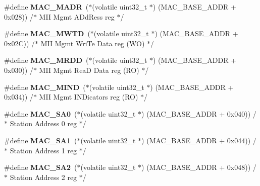 \begin{DoxyCompactItemize}
\item 
\mbox{\label{group__lpc24xx__regs_gace13d839acb863126a084b80082e0f72}} 
\#define {\bfseries M\+A\+C\+\_\+\+M\+A\+DR}~($\ast$(volatile uint32\+\_\+t $\ast$) (M\+A\+C\+\_\+\+B\+A\+S\+E\+\_\+\+A\+D\+DR + 0x028)) /$\ast$ M\+I\+I Mgmt A\+Dd\+Ress reg $\ast$/
\item 
\mbox{\label{group__lpc24xx__regs_ga9a456119d71c75f1ef7803b25b9d0a3c}} 
\#define {\bfseries M\+A\+C\+\_\+\+M\+W\+TD}~($\ast$(volatile uint32\+\_\+t $\ast$) (M\+A\+C\+\_\+\+B\+A\+S\+E\+\_\+\+A\+D\+DR + 0x02\+C)) /$\ast$ M\+I\+I Mgmt Wri\+Te Data reg (\+W\+O) $\ast$/
\item 
\mbox{\label{group__lpc24xx__regs_gaaad83a8b092ba90b535bf26af4294479}} 
\#define {\bfseries M\+A\+C\+\_\+\+M\+R\+DD}~($\ast$(volatile uint32\+\_\+t $\ast$) (M\+A\+C\+\_\+\+B\+A\+S\+E\+\_\+\+A\+D\+DR + 0x030)) /$\ast$ M\+I\+I Mgmt Rea\+D Data reg (\+R\+O) $\ast$/
\item 
\mbox{\label{group__lpc24xx__regs_ga1f43ed6ed5a8740f2f75340c75313f90}} 
\#define {\bfseries M\+A\+C\+\_\+\+M\+I\+ND}~($\ast$(volatile uint32\+\_\+t $\ast$) (M\+A\+C\+\_\+\+B\+A\+S\+E\+\_\+\+A\+D\+DR + 0x034)) /$\ast$ M\+I\+I Mgmt I\+N\+Dicators reg (\+R\+O) $\ast$/
\item 
\mbox{\label{group__lpc24xx__regs_ga36eb45727a65852e985897b250e7f635}} 
\#define {\bfseries M\+A\+C\+\_\+\+S\+A0}~($\ast$(volatile uint32\+\_\+t $\ast$) (M\+A\+C\+\_\+\+B\+A\+S\+E\+\_\+\+A\+D\+DR + 0x040)) /$\ast$ Station Address 0 reg $\ast$/
\item 
\mbox{\label{group__lpc24xx__regs_gabd16768b59166ae3013139b946cfa942}} 
\#define {\bfseries M\+A\+C\+\_\+\+S\+A1}~($\ast$(volatile uint32\+\_\+t $\ast$) (M\+A\+C\+\_\+\+B\+A\+S\+E\+\_\+\+A\+D\+DR + 0x044)) /$\ast$ Station Address 1 reg $\ast$/
\item 
\mbox{\label{group__lpc24xx__regs_gad433c0d7fea91fb6b4df3c391790b5de}} 
\#define {\bfseries M\+A\+C\+\_\+\+S\+A2}~($\ast$(volatile uint32\+\_\+t $\ast$) (M\+A\+C\+\_\+\+B\+A\+S\+E\+\_\+\+A\+D\+DR + 0x048)) /$\ast$ Station Address 2 reg $\ast$/
\item 

\end{DoxyCompactItemize}
